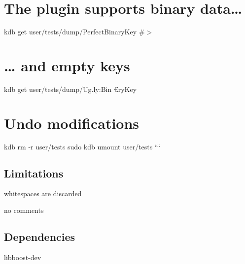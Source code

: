 \section*{The plugin supports binary data…}

kdb get user/tests/dump/\+Perfect\+Binary\+Key \#$>$ 

\section*{… and empty keys}

kdb get user/tests/dump/\+Ug.\+ly\+:Bin{\itshape } €ry\+Key

\section*{Undo modifications}

kdb rm -\/r user/tests sudo kdb umount user/tests ```

\subsection*{Limitations}


\begin{DoxyItemize}
\item whitespaces are discarded
\item no comments
\end{DoxyItemize}

\subsection*{Dependencies}


\begin{DoxyItemize}
\item {\ttfamily libboost-\/dev} 
\end{DoxyItemize}